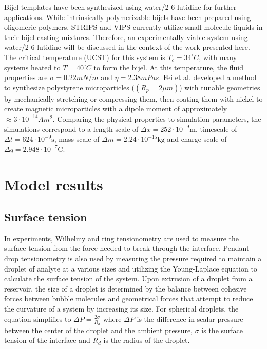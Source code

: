Bijel templates have been synthesized using water/2-6-lutidine for further applications. \cite{lee_making_2013} 
While intrinsically polymerizable bijels have been prepared using oligomeric polymers, STRIPS and VIPS currently 
utilize small molecule liquids in their bijel casting mixtures. Therefore, an experimentally viable system using 
water/2-6-lutidine will be discussed in the context of the work presented here. The critical temperature (UCST) 
for this system is $T_c = 34 ^{\circ}C$, with many systems heated to $T = 40^{\circ}C$ to form the bijel. At this 
temperature, the fluid properties are $\sigma = 0.22 mN/m$ and $\eta = 2.38 mPas$. \cite{grattoni_lower_1993} 
Fei et al. developed a method to synthesize polystyrene microparticles ($(R_p = 2 \mu m)$) with tunable geometries 
by mechanically stretching or compressing them, then coating them with nickel to create magnetic microparticles with 
a dipole moment of approximately$\approx 3 \cdot 10^{-14} Am^2$. \cite{fei_active_2017, fei_magneto-capillary_2020} 
Comparing the physical properties to simulation parameters, the simulations correspond to a length scale of
$\Delta x = 252 \cdot 10^{-9} \text{m}$, timescale of $\Delta t = 624 \cdot 10^{-9} \text{s}$, 
mass scale of $\Delta m = 2.24 \cdot 10^{-15} \text{kg}$ and charge scale of $\Delta q = 2.948 \cdot 10^{-7} \text{C}$. 

\section{Model results}
\label{section:model_results}

\subsection{Surface tension}
\label{section:model_surface_tension}

In experiments, Wilhelmy and ring tensionometry are used to measure the surface tension from the force needed 
to break through the interface. Pendant drop tensionometry is also used by measuring the pressure required to 
maintain a droplet of analyte at a various sizes and utilizing the Young-Laplace equation to calculate the 
surface tension of the system. \cite{sun_assembly_2013, berry_measurement_2015}
Upon extrusion of a droplet from a reservoir, the size of a droplet is determined by the balance between 
cohesive forces between bubble molecules and geometrical forces that attempt to reduce the curvature of a 
system by increasing its size. For spherical droplets, the equation simplifies to 
$\Delta P = \frac{2 \sigma}{R_d}$ where $\Delta P$ is the difference in scalar pressure 
between the center of the droplet and the ambient pressure, $\sigma$ is the surface tension 
of the interface and $R_d$ is the radius of the droplet. 

